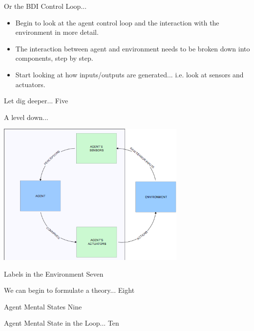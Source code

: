 \documentclass[xcolor=dvipsnames,t]{beamer}
\begin{document}
\begin{frame}{Or the BDI Control Loop...}
    \begin{itemize}
        \item Begin to look at the agent control loop and the interaction
              with the environment in more detail.
        \item The interaction between agent and environment needs to be
              broken down into components, step by step.
        \item Start looking at how inputs/outputs are generated...
              i.e. look at sensors and actuators.
    \end{itemize} 
\end{frame} 

\begin{frame}{Let dig deeper...}
Five
\end{frame} 

\begin{frame}{A level down...}
    \begin{center}
        \includegraphics[width=0.7\textwidth]{sensorsactuators} 
    \end{center} 
\end{frame} 

\begin{frame}{Labels in the Environment}  
Seven
\end{frame} 

\begin{frame}{We can begin to formulate a theory...}
Eight
\end{frame} 

\begin{frame}{Agent Mental States}
Nine
\end{frame} 

\begin{frame}{Agent Mental State in the Loop...}
Ten
\end{frame} 
\end{document}
